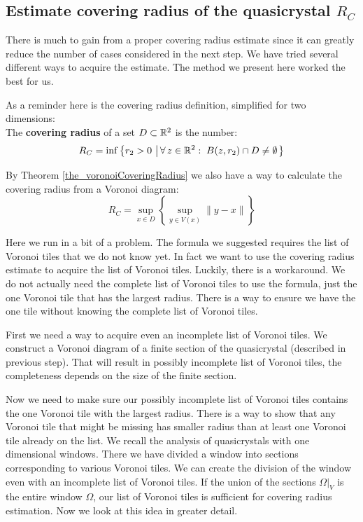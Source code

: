 \documentclass[text.tex]{subfiles}
\begin{document}
\subsection{Estimate covering radius of the quasicrystal $R_C$}
There is much to gain from a proper covering radius estimate since it can greatly reduce the number of cases considered in the next step. We have tried several different ways to acquire the estimate. The method we present here worked the best for us. 

As a reminder here is the covering radius definition, simplified for two dimensions:\\
The \textbf{covering radius} of a set $D\subset \mathbb{R}^2$ is the number: 
$$R_C = \inf\left\{ r_2>0\,\left|\, \forall\, z\in\mathbb{R}^2:\; B(z,r_2)\cap D \neq \emptyset \right. \right\}$$

By Theorem \ref{the_voronoiCoveringRadius} we also have a way to calculate the covering radius from a Voronoi diagram:
$$R_C = \sup_{x\in D}\left\{\sup_{y\in V(x)}\lVert y-x\rVert\right\}$$

Here we run in a bit of a problem. The formula we suggested requires the list of Voronoi tiles that we do not know yet. In fact we want to use the covering radius estimate to acquire the list of Voronoi tiles. Luckily, there is a workaround. We do not actually need the complete list of Voronoi tiles to use the formula, just the one Voronoi tile that has the largest radius. There is a way to ensure we have the one tile without knowing the complete list of Voronoi tiles. 

First we need a way to acquire even an incomplete list of Voronoi tiles. We construct a Voronoi diagram of a finite section of the quasicrystal (described in previous step). That will result in possibly incomplete list of Voronoi tiles, the completeness depends on the size of the finite section. 

Now we need to make sure our possibly incomplete list of Voronoi tiles contains the one Voronoi tile with the largest radius. There is a way to show that any Voronoi tile that might be missing has smaller radius than at least one Voronoi tile already on the list. We recall the analysis of quasicrystals with one dimensional windows. There we have divided a window into sections corresponding to various Voronoi tiles. We can create the division of the window even with an incomplete list of Voronoi tiles. If the union of the sections $\Omega|_V$ is the entire window $\Omega$, our list of Voronoi tiles is sufficient for covering radius estimation. Now we look at this idea in greater detail. 
\end{document}
